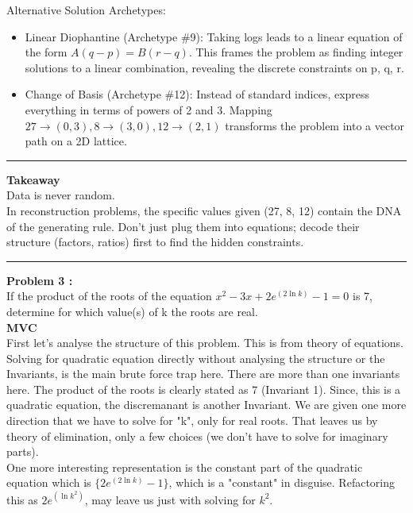 \documentclass{article}
\begin{document}
\noindent Alternative Solution Archetypes:
\begin{itemize}
    \item Linear Diophantine (Archetype \#9): Taking logs leads to a linear equation of the form $A(q-p) = B(r-q)$. This frames the problem as finding integer solutions to a linear combination, revealing the discrete constraints on p, q, r.
    \item Change of Basis (Archetype \#12): Instead of standard indices, express everything in terms of powers of 2 and 3. Mapping $27 \to (0,3), 8 \to (3,0), 12 \to (2,1)$ transforms the problem into a vector path on a 2D lattice.
\end{itemize}

\noindent \rule{\textwidth}{0.4pt}

\noindent \textbf{Takeaway} \\

\noindent Data is never random. \\

\noindent In reconstruction problems, the specific values given (27, 8, 12) contain the DNA of the generating rule. Don't just plug them into equations; decode their structure (factors, ratios) first to find the hidden constraints.\\

\noindent \rule{\textwidth}{0.4pt}

\noindent \textbf{Problem 3 :} \\

\noindent If the product of the roots of the equation $x^2 - 3x + 2e^{(2 \ln k)} - 1 = 0$ is 7, determine for which value(s) of k the roots are real. \\

\noindent \textbf{MVC} \\

\noindent First let's analyse the structure of this problem. This is from theory of equations. Solving for quadratic equation directly without analysing the structure or the Invariants, is the main brute force trap here. There are more than one invariants here. The product of the roots is clearly stated as 7 (Invariant 1). Since, this is a quadratic equation, the discremanant is another Invariant. We are given one more direction that we have to solve for "k", only for real roots. That leaves us by theory of elimination, only a few choices (we don't have to solve for imaginary parts). \\

\noindent One more interesting representation is the constant part of the quadratic equation which is $\{2e^{(2 \ln k)} - 1\}$, which is a "constant" in disguise. Refactoring this as $2e^{(\ln k^2)}$, may leave us just with solving for $k^2$. \\
\end{document}
